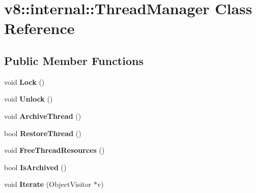 \hypertarget{classv8_1_1internal_1_1_thread_manager}{}\section{v8\+:\+:internal\+:\+:Thread\+Manager Class Reference}
\label{classv8_1_1internal_1_1_thread_manager}
\subsection*{Public Member Functions}
\begin{DoxyCompactItemize}
\item 
void {\bfseries Lock} ()\hypertarget{classv8_1_1internal_1_1_thread_manager_a8de7abc8b0763f0e1117b61f074410da}{}\label{classv8_1_1internal_1_1_thread_manager_a8de7abc8b0763f0e1117b61f074410da}

\item 
void {\bfseries Unlock} ()\hypertarget{classv8_1_1internal_1_1_thread_manager_ab7d0f390011373f4b036548923add1bf}{}\label{classv8_1_1internal_1_1_thread_manager_ab7d0f390011373f4b036548923add1bf}

\item 
void {\bfseries Archive\+Thread} ()\hypertarget{classv8_1_1internal_1_1_thread_manager_a36506aaa6d781c749efe48996b48e2a0}{}\label{classv8_1_1internal_1_1_thread_manager_a36506aaa6d781c749efe48996b48e2a0}

\item 
bool {\bfseries Restore\+Thread} ()\hypertarget{classv8_1_1internal_1_1_thread_manager_ac7d4ad5d9a21d88fc2d50f5d91a62442}{}\label{classv8_1_1internal_1_1_thread_manager_ac7d4ad5d9a21d88fc2d50f5d91a62442}

\item 
void {\bfseries Free\+Thread\+Resources} ()\hypertarget{classv8_1_1internal_1_1_thread_manager_a7ff25a1bc335c55e57bae1f262f5ac0e}{}\label{classv8_1_1internal_1_1_thread_manager_a7ff25a1bc335c55e57bae1f262f5ac0e}

\item 
bool {\bfseries Is\+Archived} ()\hypertarget{classv8_1_1internal_1_1_thread_manager_a8a5b4eb523ed06c372852b14b5825efb}{}\label{classv8_1_1internal_1_1_thread_manager_a8a5b4eb523ed06c372852b14b5825efb}

\item 
void {\bfseries Iterate} (Object\+Visitor $\ast$v)\hypertarget{classv8_1_1internal_1_1_thread_manager_adeebd606e3b84bf2695ef0e36e90c360}{}\label{classv8_1_1internal_1_1_thread_manager_adeebd606e3b84bf2695ef0e36e90c360}


\end{DoxyCompactItemize}

